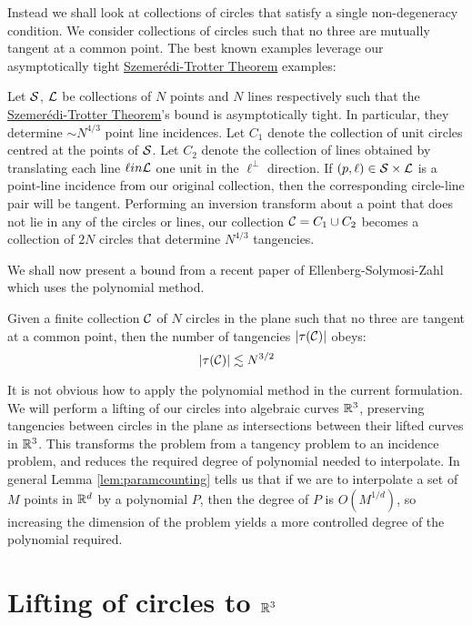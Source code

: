 Instead we shall look at collections of circles that satisfy a single non-degeneracy condition. We consider collections of circles 
such that no three are mutually tangent at a common point. The best known examples leverage our asymptotically tight \hyperref[thm:S-T]{Szemerédi-Trotter Theorem} examples:
\begin{example}
    Let $\mathcal S$, $\mathcal L$ be collections of $N$ points and $N$ lines respectively such that the \hyperref[thm:S-T]{Szemerédi-Trotter Theorem}'s bound is asymptotically tight. 
    In particular, they determine $\sim N^{4/3}$ point line incidences. 
    Let $C_1$ denote the collection of unit circles centred at the points of $\mathcal S$. 
    Let $C_2$ denote the collection of lines obtained by translating each line $\ell in \mathcal L$ one unit in the $\ell^{\perp}$ direction.
    If $(p,\ell) \in \mathcal S \times \mathcal L$ is a point-line incidence from our original collection, then the corresponding circle-line pair will be tangent.
    Performing an inversion transform about a point that does not lie in any of the circles or lines, our collection $\mathcal C = C_1 \cup C_2$ becomes a 
    collection of $2N$ circles that determine $N^{4/3}$ tangencies.
 \end{example}

We shall now present a bound from a recent paper of Ellenberg-Solymosi-Zahl which uses the polynomial method.\cite{ellenberg2016new}

\begin{theorem}
    Given a finite collection $\mathcal C$ of $N$ circles in the plane such that no three are tangent at a common point, 
    then the number of tangencies $|\tau(\mathcal C)|$ obeys:   \label{thm:circle-tangencies}
    \[
        |\tau(\mathcal C)| \lesssim N^{3/2}
    \]
\end{theorem}

It is not obvious how to apply the polynomial method in the current formulation. 
We will perform a lifting  of our circles into algebraic curves $\mathbb R^3$, 
preserving tangencies between circles in the plane as intersections between their lifted curves in $\mathbb R^3$. 
This transforms the problem from a tangency problem to an incidence problem, and reduces the required degree of polynomial needed to interpolate.
In general Lemma \ref{lem:paramcounting} tells us that if we are to interpolate a set of $M$ points in $\mathbb R^d$ by a polynomial $P$, then the degree of $P$ is $O(M^{1/d})$, 
so increasing the dimension of the problem yields a more controlled degree of the polynomial required.

\section{Lifting of circles to $\mathbb R^3$}


